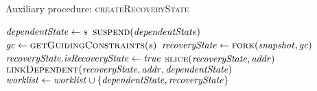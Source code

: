 \begin{algorithm}
  \caption{Auxiliary procedure: \textsc{createRecoveryState}
  \label{fig:aux-func-recS}}
\begin{algorithmic}[1]

   \label{alg:recover-foreach}
     \label{alg:recover-if-found}
       \State $\mathit{dependentState} \gets s$ \label{alg:recover-gen-depS}
       \State $\Call{suspend}{\dependentState}$ \label{alg:recover-suspend}
       \State $\gc \gets  \Call{getGuidingConstraints}{\workstate}$ \label{alg:recover-get-gc}
       \State $\recoveryState \gets \Call{fork}{\snapshot,\gc}$ \label{alg:recover-gen-recS}
       \State $\mathit{recoveryState}.\mathit{isRecoveryState} \gets \mathit{true}$ \label{alg:recover-set-is-recS}
       \State $\Call{slice}{\recoveryState,\addr}$ \label{alg:recover-slice}
       \State $\Call{linkDependent}{\recoveryState,\addr,\dependentState}$ \label{alg:recover-record-dep}
       \State $\mathit{worklist}  \gets  \mathit{worklist}  \cup \{\mathit{dependentState},\mathit{recoveryState}\}$
       \label{alg:push-worklist-recovery}
    \EndIf
  \EndFor
\EndFunction
\end{algorithmic}
\end{algorithm}

